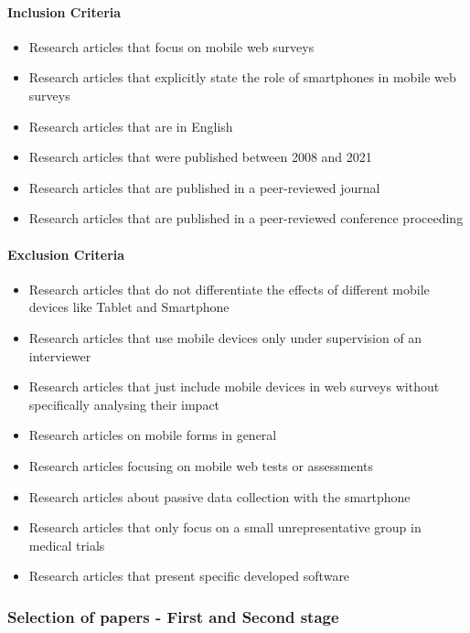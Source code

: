 \paragraph{Inclusion Criteria}
\begin{itemize}
    \item Research articles that focus on mobile web surveys
    \item Research articles that explicitly state the role of smartphones in mobile web surveys
    \item Research articles that are in English
    \item Research articles that were published between 2008 and 2021
    \item Research articles that are published in a peer-reviewed journal
    \item Research articles that are published in a peer-reviewed conference proceeding
\end{itemize}

\paragraph{Exclusion Criteria}
\begin{itemize}
    \item Research articles that do not differentiate the effects of different mobile devices like Tablet and Smartphone
    \item Research articles that use mobile devices only under supervision of an interviewer
    \item Research articles that just include mobile devices in web surveys without specifically analysing their impact
    \item Research articles on mobile forms in general
    \item Research articles focusing on mobile web tests or assessments
    \item Research articles about passive data collection with the smartphone
    \item Research articles that only focus on a small unrepresentative group in medical trials
    \item Research articles that present specific developed software
\end{itemize}

\subsubsection{Selection of papers - First and Second stage}

